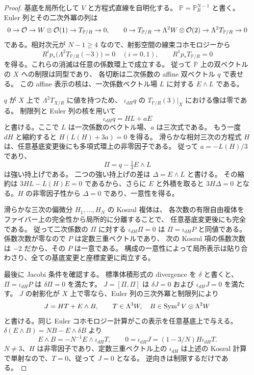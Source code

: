 \begin{proof}
基底を局所化して $V$ と方程式直線を自明化する。
$\mathbb P=\mathbb P^{N-1}_R$ と書く。
Euler 列とその二次外冪の列は
\[
 0\to\mathcal O\to W\otimes\mathcal O(1)\to T_{\mathbb P/R}\to0,\qquad
 0\to T_{\mathbb P/R}\to\Lambda^2W\otimes\mathcal O(2)
      \to\Lambda^2T_{\mathbb P/R}\to0
\]
である。相対次元が $N-1\ge4$ なので、射影空間の線束コホモロジーから
\[
 R^ip_*\bigl(\Lambda^2T_{\mathbb P/R}(-3)\bigr)=0
 \quad(i=0,1),\qquad R^1p_*T_{\mathbb P/R}=0
\]
を得る。これらの消滅は任意の係数環上で成立する。
従って $\mathbb P$ 上の双ベクトルの $X$ への制限は同型であり、
各切断は二次係数の affine 双ベクトル $q$ で表せる。
この affine 表示の核は、一次係数ベクトル場 $L$ に対する $E\wedge L$ である。

$q$ が $X$ 上で $\Lambda^2T_{X/R}$ に値を持つため、
$\iota_{dH}q$ の $T_{\mathbb P/R}(3)|_X$ における像は零である。
制限列と Euler 列の核を用いて
\[
 \iota_{dH}q=HL+aE
\]
と書ける。ここで $L$ は一次係数のベクトル場、$a$ は三次式である。
もう一度 $dH$ と縮約すると $H(L(H)+3a)=0$ を得る。
滑らかな相対三次の方程式 $H$ は、任意基底変更後にも多項式環上の非零因子である。
従って $a=-L(H)/3$ であり、
\[
 \Pi=q-\tfrac13E\wedge L
\]
は強い持上げである。
二つの強い持上げの差は $\Delta=E\wedge L$ と書ける。
その縮約は $3HL-L(H)E=0$ であるから、さらに $E$ と外積を取ると
$3H\Delta=0$ となる。$H$ の非零因子性から $\Delta=0$ であり、一意性を得る。

滑らかな三次の偏微分 $H_1,\ldots,H_N$ の Koszul 複体は、
各次数の有限自由複体をファイバー上の完全性から局所的に分離することで、
任意基底変更後にも完全である。
従って二次係数の $\Pi$ に対する $\iota_{dH}\Pi=0$ は
$\Pi=\iota_{dH}P$ と同値である。
係数次数が零なので $P$ は定数三重ベクトルであり、
次の Koszul 項の係数次数は $-2$ だから、その $P$ は一意である。
構成の一意性によって局所表示は貼り合わさり、全ての基底変更と座標変更に両立する。

最後に Jacobi 条件を確認する。
標準体積形式の divergence を $\delta$ と書くと、
$\Pi=\iota_{dH}P$ は $\delta\Pi=0$ を満たす。
$J=[\Pi,\Pi]$ は $\delta J=0$ および $\iota_{dH}J=0$ を満たす。
$J$ の射影化が $X$ 上で零なら、Euler 列の三次外冪と制限列により
\[
 J=HT+E\wedge B,\qquad
 T\in\Lambda^3W,\quad B\in\operatorname{Sym}^2V\otimes\Lambda^2W
\]
と書ける。同じ Euler コホモロジー計算がこの表示を任意基底上で与える。
$\delta(E\wedge B)=NB-E\wedge\delta B$ より
\[
 E\wedge B=-N^{-1}E\wedge\iota_{dH}T,\qquad
 0=\iota_{dH}J=(1-3/N)H\iota_{dH}T.
\]
$N\ne3$、$H$ は非零因子であり、定数三重ベクトル上の
$\iota_{dH}$ は上述の Koszul 計算で単射なので、$T=0$、従って $J=0$ となる。
逆向きは制限するだけである。
\end{proof}


